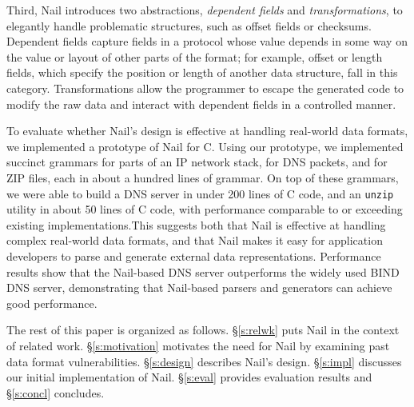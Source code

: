 
Third, Nail introduces two abstractions, \emph{dependent fields} and
\emph{transformations}, to elegantly handle problematic structures,
such as offset fields or checksums.  Dependent fields capture fields
in a protocol whose value depends in some way on the value or layout
of other parts of the format; for example, offset or length fields,
which specify the position or length of another data structure, fall
in this category.  Transformations allow the programmer to escape the
generated code to modify the raw data and interact with dependent fields
in a controlled manner.

To evaluate whether Nail's design is effective at handling real-world data
formats, we implemented a prototype of Nail for C\@. Using our prototype, we
implemented succinct grammars for parts of an IP network stack, for DNS packets,
and for ZIP files, each in about a hundred lines of grammar. On top of these
grammars, we were able to build a DNS server in under 200 lines of C code, and
an {\tt unzip} utility in about 50 lines of C code, with performance comparable
to or exceeding existing implementations.This suggests both that Nail is
effective at handling complex real-world data formats, and that Nail makes it
easy for application developers to parse and generate external data
representations. Performance results show that the Nail-based DNS server
outperforms the widely used BIND DNS server, demonstrating that Nail-based
parsers and generators can achieve good performance.

The rest of this paper is organized as follows.  \S\ref{s:relwk}
puts Nail in the context of related work.
\S\ref{s:motivation} motivates the need for Nail by examining
past data format vulnerabilities.
\S\ref{s:design} describes
Nail's design.  \S\ref{s:impl} discusses our initial implementation
of Nail.  \S\ref{s:eval} provides evaluation results and
\S\ref{s:concl} concludes.


